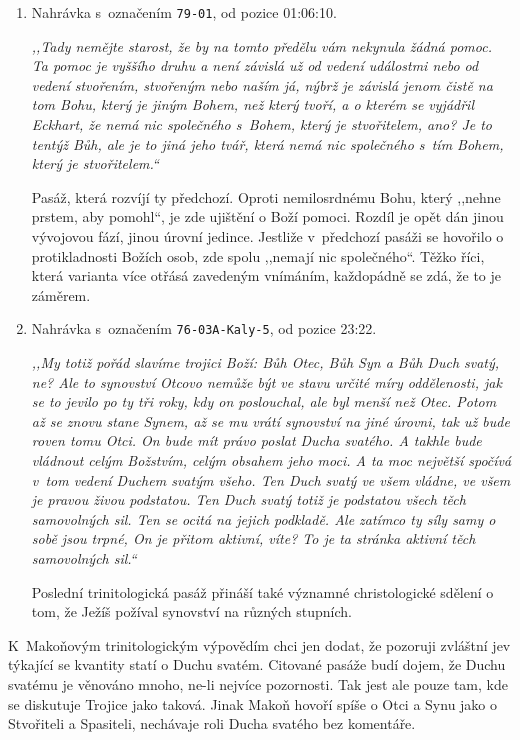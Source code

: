 \begin{enumerate}
{}

\item{%
Nahrávka s~označením \texttt{79-01}, od pozice 01:06:10.

\textit{%
,,Tady nemějte starost, že by na tomto předělu vám nekynula žádná pomoc. Ta pomoc
je vyššího druhu a není závislá už od vedení událostmi nebo od vedení stvořením,
stvořeným nebo naším já, nýbrž je závislá jenom čistě na tom Bohu, který je jiným
Bohem, než který tvoří, a o kterém se vyjádřil Eckhart, že nemá nic společného
s~Bohem, který je stvořitelem, ano? Je to tentýž Bůh, ale je to jiná jeho tvář, která
nemá nic společného s~tím Bohem, který je stvořitelem.``
}

Pasáž, která rozvíjí ty předchozí. Oproti nemilosrdnému Bohu, který
,,nehne prstem, aby pomohl``, je zde ujištění o Boží pomoci. Rozdíl je
opět dán jinou vývojovou fází, jinou úrovní jedince. Jestliže v~předchozí pasáži
se hovořilo o protikladnosti Božích osob, zde spolu ,,nemají nic společného``.
Těžko říci, která varianta více otřásá zavedeným vnímáním, každopádně se zdá, že
to je záměrem.
}

\item{
Nahrávka s~označením \texttt{76-03A-Kaly-5}, od pozice 23:22.

\textit{%
,,My totiž pořád slavíme trojici Boží: Bůh Otec, Bůh Syn a Bůh Duch svatý, ne?
Ale to synovství Otcovo nemůže být ve stavu určité míry oddělenosti, jak se to
jevilo po ty tři roky, kdy on poslouchal, ale byl menší než Otec. Potom až se
znovu stane Synem, až se mu vrátí synovství na jiné úrovni, tak už bude roven
tomu Otci. On bude mít právo poslat Ducha svatého. A takhle bude vládnout celým
Božstvím, celým obsahem jeho moci. A ta moc největší spočívá v~tom vedení Duchem
svatým všeho. Ten Duch svatý ve všem vládne, ve všem je pravou živou podstatou.
Ten Duch svatý totiž je podstatou všech těch samovolných sil. Ten se ocitá na
jejich podkladě. Ale zatímco ty síly samy o sobě jsou trpné, On je přitom
aktivní, víte? To je ta stránka aktivní těch samovolných sil.``
}

Poslední trinitologická pasáž přináší také významné christologické sdělení o
tom, že Ježíš požíval synovství na různých stupních.

}

\end{enumerate}

K~Makoňovým trinitologickým výpovědím chci jen dodat, že pozoruji zvláštní jev
týkající se kvantity statí o Duchu svatém. Citované pasáže budí dojem, že Duchu
svatému je věnováno mnoho, ne-li nejvíce pozornosti. Tak jest ale pouze tam, kde
se diskutuje Trojice jako taková. Jinak Makoň hovoří spíše o Otci a Synu jako o
Stvořiteli a Spasiteli, nechávaje roli Ducha svatého bez komentáře.


